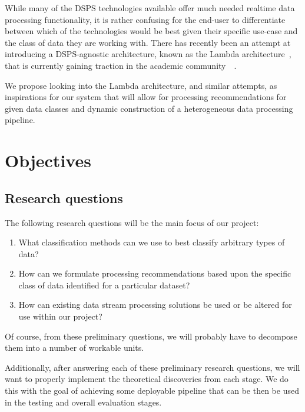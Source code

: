 \documentclass[a4paper,11pt]{article}
\begin{document}
While many of the DSPS technologies available offer much needed realtime data processing functionality, it is rather
confusing for the end-user to differentiate between which of the technologies would be best given their specific
use-case and the class of data they are working with. There has recently been an attempt at introducing a DSPS-agnostic
architecture, known as the Lambda architecture~\cite{marz2013principles}, that is currently gaining traction in the
academic community~\cite{islam_cloud_2014}~\cite{liu_survey_2014}.

We propose looking into the Lambda architecture, and similar attempts, as inspirations for our system that will allow
for processing recommendations for given data classes and dynamic construction of a heterogeneous data processing
pipeline.





\section{Objectives} %
\label{sec:objectives}

\subsection{Research questions} %
\label{sub:research_questions}

The following research questions will be the main focus of our project:

\begin{enumerate}
  \item What classification methods can we use to best classify arbitrary types of data?
  \item How can we formulate processing recommendations based upon the specific class of data identified for a particular dataset?
  \item How can existing data stream processing solutions be used or be altered for use within our project?
\end{enumerate}

Of course, from these preliminary questions, we will probably have to decompose them into a number of workable units.

Additionally, after answering each of these preliminary research questions, we will want to properly implement the
theoretical discoveries from each stage. We do this with the goal of achieving some deployable pipeline that can be then
be used in the testing and overall evaluation stages.
\end{document}
